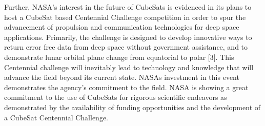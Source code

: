 \documentclass[11pt]{article}
\begin{document}
Further, NASA’s interest in the future of CubeSats is evidenced in its plans to host a CubeSat based Centennial Challenge competition in order to spur the advancement of propulsion and communication technologies for deep space applications. Primarily, the challenge is designed to develop innovative ways to return error free data from deep space without government assistance, and to demonstrate lunar orbital plane change from equatorial to polar [3]. This Centennial challenge will inevitably lead to technology and knowledge that will advance the field beyond its current state. NASAs investment in this event demonstrates the agency’s commitment to the field. 
     NASA is showing a great commitment to the use of CubeSats for rigorous scientific endeavors as demonstrated by the availability of funding opportunities and the development of a CubeSat Centennial Challenge. 




\end{document}
